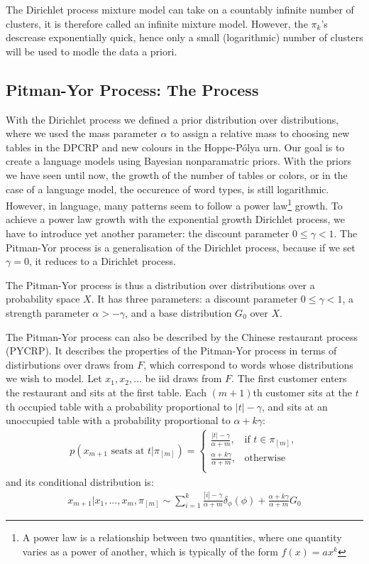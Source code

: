 The Dirichlet process mixture model can take on a countably infinite number of clusters, it is therefore called an infinite mixture model. However, the $\pi_k$'s descrease exponentially quick, hence only a small (logarithmic) number of clusters will be used to modle the data a priori.



\subsection{Pitman-Yor Process: The Process}
With the Dirichlet process we defined a prior distribution over distributions, where we used the mass parameter $\alpha$ to assign a relative mass to choosing new tables in the DPCRP and new colours in the Hoppe-P\'olya urn. Our goal is to create a language models using Bayesian nonparamatric priors. With the priors we have seen until now, the growth of the number of tables or colors, or in the case of a language model, the occurence of word types, is still logarithmic. However, in language, many patterns seem to follow a power law\footnote{A power law is a relationship between two quantities, where one quantity varies as a power of another, which is typically of the form $f(x)=ax^k$} growth. 
To achieve a power law growth with the exponential growth Dirichlet process, we have to introduce yet another parameter: the discount parameter $0 \leq \gamma < 1$. The Pitman-Yor process is a generalisation of the Dirichlet process, because if we set $\gamma = 0$, it reduces to a Dirichlet process.

The Pitman-Yor process is thus a distribution over distributions over a probability space $X$. It has three parameters: a discount parameter $0\leq\gamma<1$, a strength parameter $\alpha > -\gamma$, and a base distribution $G_0$ over $X$. 

The Pitman-Yor process can also be described by the Chinese restaurant process (PYCRP). It describes the properties of the Pitman-Yor process in terms of distirbutions over draws from $F$, which correspond to words whose distributions we wish to model. Let $x_1, x_2,\ldots$ be iid draws from $F$. The first customer enters the restaurant and sits at the first table. Each $(m+1)$th customer sits at the $t$th occupied table with a probability proportional to $|t|-\gamma$, and sits at an unoccupied table with a probability proportional to $\alpha+k\gamma$:
\begin{align}
	p(x_{m+1}\text{ seats at }t|\pi_{[m]}) = 
    	\begin{cases}
        	\frac{|t|-\gamma}{\alpha+m}, & \text{if }t\in\pi_{[m]},\\
           	\frac{\alpha+k\gamma}{\alpha+m}, & \text{otherwise}\\ 
        \end{cases}
\end{align}
and its conditional distribution is:
\begin{align}\label{eq:pycrpconddist}
	x_{m+1}|x_1,\ldots,x_m, \pi_{[m]} \sim \sum_{i=1}^k \frac{|i|-\gamma}{\alpha+m}\delta_\phi(\phi) + \frac{\alpha+k\gamma}{\alpha+m}G_0
\end{align}

